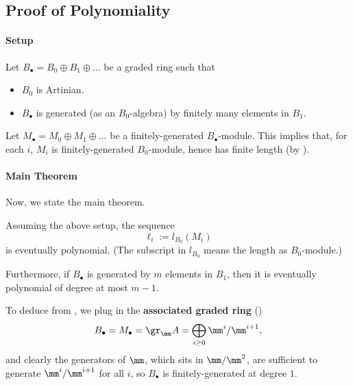 \subsection{Proof of Polynomiality}
\paragraph{Setup} Let $B_\bullet = B_0\oplus B_1\oplus\dots$
be a graded ring such that
\begin{itemize}
    \item $B_0$ is Artinian.
    \item $B_\bullet$ is generated (as an $B_0$-algebra)
    by finitely many elements in $B_1$.
\end{itemize}
Let $M_\bullet = M_0\oplus M_1\oplus\dots$ be a finitely-generated
$B_\bullet$-module.
This implies that, for each $i$, 
$M_i$ is finitely-generated $B_0$-module,
hence has finite length (by ).

\paragraph{Main Theorem}
Now, we state the main theorem.
\begin{theorem}
    \label{thm:hilbert_dim_module}
    Assuming the above setup, the sequence
    $$\ell_i := l_{B_0}(M_i)$$
    is eventually polynomial.
    (The subscript in $l_{B_0}$ means the length
    as $B_0$-module.)
    
    Furthermore, if $B_\bullet$ is generated by 
    $m$ elements in $B_1$, 
    then it is eventually polynomial of degree at most $m-1$.
\end{theorem}
To deduce  from ,
we plug in the \textbf{associated graded ring}
()
$$B_\bullet = M_\bullet = \gr_\mm A = \bigoplus_{i\geq 0} \mm^i/\mm^{i+1},$$
and clearly the generators of $\mm$,
which sits in $\mm/\mm^2$, are sufficient
to generate $\mm^i/\mm^{i+1}$ for all $i$,
so $B_\bullet$ is finitely-generated at degree $1$.

